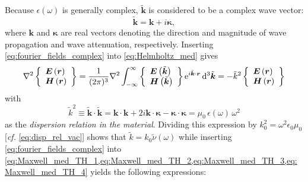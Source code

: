 Because $\epsilon(\omega)$ is generally complex, $\mathbold{\tilde{k}}$ is considered to be a complex wave vector:
\begin{equation}
 \mathbold{\tilde{k}} = \mathbold{k} + i \mathbold{\kappa} , \label{eq:k_tilde_def}
 \end{equation}
where $\mathbold{k}$ and $\mathbold{\kappa}$ are real vectors denoting the direction and magnitude of wave propagation and wave attenuation, respectively. 
Inserting \cref{eq:fourier_fields_complex} into \cref{eq:Helmholtz_med} gives 
\begin{equation}
 \laplacian \left\{
  \begin{array}{lr}
  \mathbold{E} \left( \mathbold{r} \right) \\
  \mathbold{H} \left( \mathbold{r} \right)
  \end{array}
 \right\} = \frac{1}{(2 \pi)^3} \laplacian \int_{-\mathbold{\infty}}^{\mathbold{\infty}} \left\{
  \begin{array}{lr}
  \mathbold{E} \left( \mathbold{\tilde{k}} \right) \\
  \mathbold{H} \left( \mathbold{\tilde{k}} \right)
  \end{array}
 \right\} \mathrm{e}^{i \mathbold{\tilde{k}} \cdot \mathbold{r}} \dd[3]{\mathbold{\tilde{k}}}
  = - \tilde{k}^2 \left\{
  \begin{array}{lr}
  \mathbold{E} \left( \mathbold{r} \right) \\
  \mathbold{H} \left( \mathbold{r} \right)
  \end{array}
 \right\} 
 \end{equation}
with
\begin{equation}\label{eq:disp_rel_med}
 \tilde{k}^2 \equiv \mathbold{\tilde{k}} \cdot \mathbold{\tilde{k}} = \mathbold{k} \cdot \mathbold{k} + 2 i \mathbold{k} \cdot \mathbold{\kappa} - \mathbold{\kappa} \cdot \mathbold{\kappa} = \mu_0 \, \epsilon (\omega) \, \omega^2 
 \end{equation}
as the \emph{dispersion relation in the material}. 
Dividing this expression by $k_0^2 = \omega^2 \epsilon_0 \mu_0$ [\emph{cf.\@} \cref{eq:disp_rel_vac}] shows that $\tilde{k} = k_0 \tilde{\nu} (\omega)$  while inserting \cref{eq:fourier_fields_complex} into \cref{eq:Maxwell_med_TH_1,eq:Maxwell_med_TH_2,eq:Maxwell_med_TH_3,eq:Maxwell_med_TH_4} yields the following expressions:
